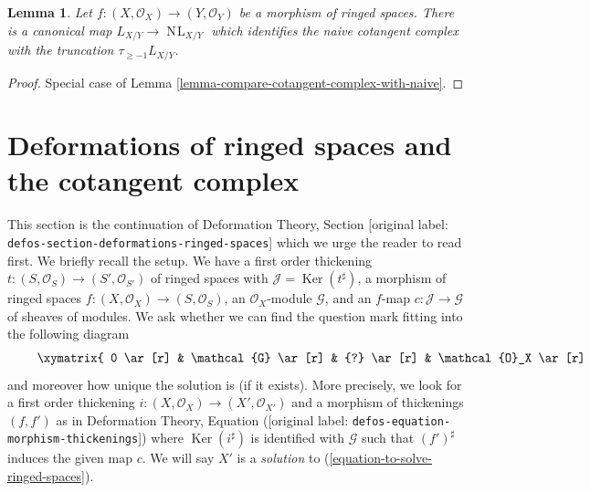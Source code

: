 \documentclass[10pt,a4paper]{article}
\theoremstyle{plain}
\newtheorem{lemma}[subsection]{Lemma}
\theoremstyle{definition}
\theoremstyle{remark}
\numberwithin{equation}{subsection}
\def\NL{\mathop{N\!L}\nolimits}
\def\Ker{\mathop{\mathrm{Ker}}}
\begin{document}
\begin{lemma}
\label{lemma-compare-cotangent-complex-with-naive-ringed-spaces}
Let $f : (X, \mathcal{O}_X) \to (Y, \mathcal{O}_Y)$ be a morphism of
ringed spaces. There is a canonical map $L_{X/Y} \to \NL_{X/Y}$ which
identifies the naive cotangent complex with the truncation
$\tau_{\geq -1}L_{X/Y}$.
\end{lemma}

\begin{proof}
Special case of Lemma \ref{lemma-compare-cotangent-complex-with-naive}.
\end{proof}






\section{Deformations of ringed spaces and the cotangent complex}
\label{section-deformations-ringed-spaces}

\noindent
This section is the continuation of
Deformation Theory, Section \textnormal{[original label: \nolinkurl{defos-section-deformations-ringed-spaces}]}
which we urge the reader to read first. We briefly recall the setup.
We have a first order thickening
$t : (S, \mathcal{O}_S) \to (S', \mathcal{O}_{S'})$ of ringed spaces
with $\mathcal{J} = \Ker(t^\sharp)$, a morphism of ringed spaces
$f : (X, \mathcal{O}_X) \to (S, \mathcal{O}_S)$, an $\mathcal{O}_X$-module
$\mathcal{G}$, and an $f$-map $c : \mathcal{J} \to \mathcal{G}$
of sheaves of modules. We ask whether we can find
the question mark fitting into the following diagram
\begin{equation}
\label{equation-to-solve-ringed-spaces}
\vcenter{
\xymatrix{
0 \ar[r] & \mathcal{G} \ar[r] & {?} \ar[r] & \mathcal{O}_X \ar[r] & 0 \\
0 \ar[r] & \mathcal{J} \ar[u]^c \ar[r] & \mathcal{O}_{S'} \ar[u] \ar[r] &
\mathcal{O}_S \ar[u] \ar[r] & 0
}
}
\end{equation}
and moreover how unique the solution is (if it exists). More precisely,
we look for a first order thickening
$i : (X, \mathcal{O}_X) \to (X', \mathcal{O}_{X'})$
and a morphism of thickenings $(f, f')$ as in
Deformation Theory, Equation (\textnormal{[original label: \nolinkurl{defos-equation-morphism-thickenings}]})
where $\Ker(i^\sharp)$ is identified with $\mathcal{G}$
such that $(f')^\sharp$ induces the given map $c$.
We will say $X'$ is a {\it solution} to
(\ref{equation-to-solve-ringed-spaces}).
\end{document}
